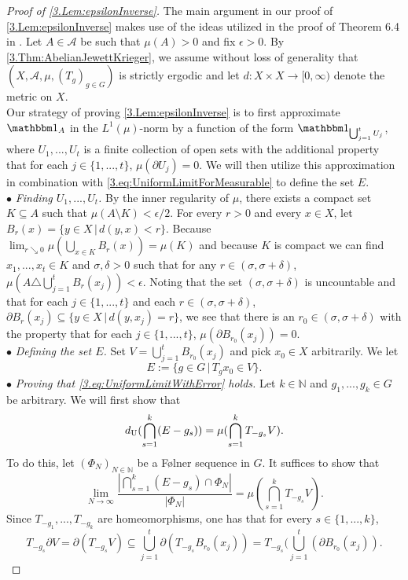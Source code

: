 \documentclass[11pt,american,preprint]{elsarticle}
\numberwithin{equation}{section}
\theoremstyle{plain}
\theoremstyle{plain*}
\theoremstyle{plain}
\theoremstyle{plain*}
\theoremstyle{plain}
\theoremstyle{plain*}
\theoremstyle{remark}
\theoremstyle{remark*}
\theoremstyle{remark}
\theoremstyle{remark*}
\theoremstyle{remark}
\theoremstyle{remark*}
\theoremstyle{plain}
\theoremstyle{definition}
\theoremstyle{plain}
\theoremstyle{plain} %
\newcommand{\N}{\mathbb{N}}
\begin{document}
\begin{proof}[Proof of \cref{3.Lem:epsilonInverse}] The main argument in our proof of \cref{3.Lem:epsilonInverse} makes use  of the ideas utilized in the proof of Theorem 6.4 in \cite{bergelson2016NonPWSyndetic}.
Let $A\in\mathcal A$ be such that $\mu(A)>0$ and fix $\epsilon>0$. By \cref{3.Thm:AbelianJewettKrieger}, we  assume without loss of generality that $(X,\mathcal A,\mu,(T_g)_{g\in G})$ is strictly ergodic and let $d:X\times X\rightarrow [0,\infty)$ denote the metric on $X$.\\
Our strategy of proving \cref{3.Lem:epsilonInverse} is to first approximate $\mathbbm 1_A$ in the $L^1(\mu)$-norm by a function of the form $\mathbbm 1_{\bigcup_{j=1}^t U_j}$, where $U_1,...,U_t$ is a finite collection of open sets with the additional property that for each $j\in \{1,...,t\}$, $\mu(\partial U_j)=0$. We will then utilize this approximation in combination with \eqref{3.eq:UniformLimitForMeasurable} to define the set $E$.\\
$\bullet$ \textit{ Finding $U_1,...,U_t$.} By the inner regularity of $\mu$, there exists a compact set $K\subseteq A$ such that $\mu(A\setminus K)<\epsilon/2$. For every $r>0$ and every $x\in X$, let $B_r(x)=\{y\in X\,|\,d(y,x)<r\}$. Because $\lim_{r\searrow 0}\mu(\bigcup_{x\in K}B_r(x))=\mu(K)$ and because $K$ is compact we can find $x_1,...,x_t\in K$ and $\sigma,\delta>0$ such that for any $r\in(\sigma,\sigma+\delta)$, $\mu(A\triangle\bigcup_{j=1}^tB_r(x_j))<\epsilon$.
Noting that the set $(\sigma,\sigma+\delta)$ is uncountable and that for each $j\in\{1,...,t\}$ and each $r\in(\sigma,\sigma+\delta)$, $\partial B_r(x_j)\subseteq\{y\in X\,|\,d(y,x_j)=r\}$, we see that there is an $r_0\in (\sigma,\sigma+\delta)$ with the property that for each $j\in\{1,...,t\}$, $\mu(\partial B_{r_0}(x_j))=0$.\\
$\bullet$ \textit{ Defining the set $E$.} Set $V=\bigcup_{j=1}^tB_{r_0}(x_j)$ and pick $x_0\in X$ arbitrarily. We let  
$$E:=\{g\in G\,|\,T_gx_0\in V\}.$$
$\bullet$ \textit{ Proving that \eqref{3.eq:UniformLimitWithError} holds.} Let $k\in\N$ and $g_1,...,g_k\in G$ be arbitrary. We will first show that $$d_{{\rm U}}(\bigcap_{s=1}^k(E-g_s))=\mu(\bigcap_{s=1}^kT_{-g_s}V).$$ 
To do this, let $(\Phi_N)_{N\in\N}$ be a F{\o}lner sequence in $G$. It suffices to show that 
$$\lim_{N\rightarrow\infty}\frac{|\bigcap_{s=1}^k(E-g_s)\cap \Phi_N|}{|\Phi_N|}=\mu(\bigcap_{s=1}^kT_{-g_s}V).$$
Since $T_{-g_1},...,T_{-g_k}$ are homeomorphisms, one has that for every $s\in\{1,...,k\}$,
$$T_{-g_s}\partial V=\partial(T_{-g_s}V)\subseteq \bigcup_{j=1}^t\partial(T_{-g_s} B_{r_0}(x_j))=T_{-g_s}(\bigcup_{j=1}^t(\partial B_{r_0}(x_j)).$$

\end{proof}
\end{document}
